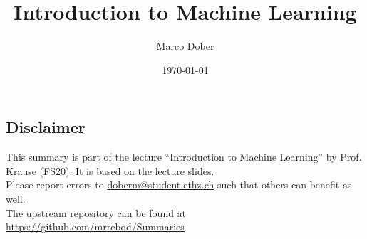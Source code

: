 \documentclass[a4paper, fontsize=8pt, landscape, DIV=1]{scrartcl}
\title{Introduction to Machine Learning}
\author{Marco Dober}
\date{\today}
\begin{document}
	\setcounter{secnumdepth}{3} %
	\begin{multicols*}{4}
		\section*{Disclaimer}
		This summary is part of the lecture ``Introduction to Machine Learning'' by Prof. Krause (FS20). It is based on the lecture slides. \\[6pt]
		Please report errors to \href{mailto:doberm@student.ethz.ch}{doberm@student.ethz.ch} such that others can benefit as well.\\[6pt]	
		The upstream repository can be found at \href{https://github.com/mrrebod/Summaries}{https://github.com/mrrebod/Summaries}
		\vfill\null
		\pagebreak
		
		\maketitle 
		\thispagestyle{fancy}
		

\end{multicols*}
\end{document}
